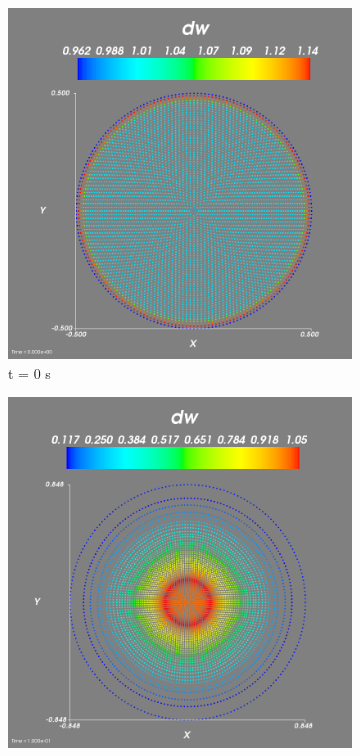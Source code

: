 \documentclass{article}
\begin{document}
\begin{figure}[!htbp]
\centering
\begin{subfigure}{.5\textwidth}
  \centering
  \includegraphics[width=1.1\linewidth]{width_t0.png}
  \caption{t = 0 s}
  \label{fig:su1}
\end{subfigure}%
\begin{subfigure}{.5\textwidth}
  \centering
  \includegraphics[width=1.1\linewidth]{width_t1.png}

\end{subfigure}
\end{figure}
\end{document}
